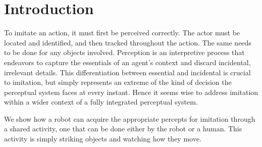 

\section{Introduction}

To imitate an action, it must first be perceived correctly.  
%
The actor must be located and identified, and then tracked 
throughout the action.  The same needs to be done for
any objects involved.
%
Perception is an interpretive process that endeavors to
capture the essentials of an agent's context and
discard incidental, irrelevant details.
%
This differentiation between essential and incidental
is crucial to imitation, but simply represents an 
extreme of the kind of decision the perceptual system
faces at every instant.  Hence it seems wise to address
imitation within a wider context of a fully integrated 
perceptual system.

%
%
%

We show how a robot can acquire the appropriate percepts for imitation
through a shared activity, one that can be done either by the robot or
a human.  This activity is simply striking objects and watching how
they move.
